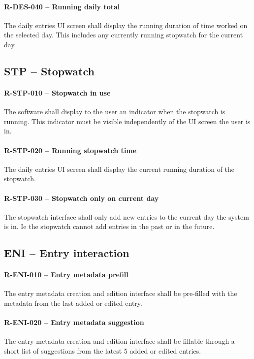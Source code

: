 \paragraph{R-DES-040 -- Running daily total}
The daily entries UI screen shall display the running duration of time worked
on the selected day. This includes any currently running stopwatch for the
current day.

\subsection{STP -- Stopwatch}
\paragraph{R-STP-010 -- Stopwatch in use}
The software shall display to the user an indicator when the stopwatch is
running. This indicator must be visible independently of the UI screen
the user is in.

\paragraph{R-STP-020 -- Running stopwatch time}
The daily entries UI screen shall display the current running duration
of the stopwatch.

\paragraph{R-STP-030 -- Stopwatch only on current day}
The stopwatch interface shall only add new entries to the current day
the system is in. Ie the stopwatch cannot add entries in the past or in
the future.

\subsection{ENI -- Entry interaction}
\paragraph{R-ENI-010 -- Entry metadata prefill}
The entry metadata creation and edition interface shall be pre-filled with
the metadata from the last added or edited entry.

\paragraph{R-ENI-020 -- Entry metadata suggestion}
The entry metadata creation and edition interface shall be fillable through
a short list of suggestions from the latest 5 added or edited entries.

